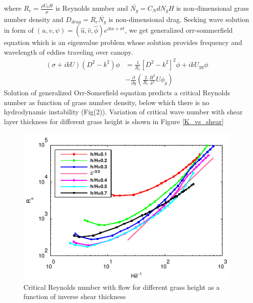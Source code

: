 \documentclass[aps,twocolumn,floatfix,prl,10pt]{revtex4-1}
\newcommand{\del}{\partial}
\begin{document}
where $R_{e}= \frac{\rho U_0 H}{\mu}$ is Reynolds number and $\bar{N_g} = C_N d N_g H$ is non-dimensional grass number density and  $D_{drag} = R_{e}\bar{N_{g}}$ is 
non-dimensional drag. Seeking wave solution in form of $\left(u,v,\psi \right)= \left(\hat u, \hat v, \hat\phi \right)e^{ikx+\sigma t}$, we get generalized orr-sommerfield equation 
which is an eigenvalue problem whose solution provides frequency and wavelength of eddies traveling over canopy.
\small
\begin{equation}
\begin{split}
\left(\sigma+ikU\right) \left(D^2-k^2\right)\phi &= \frac{1}{R_{e}}\left[D^2 -k^{2} \right]^2\phi +ikU_{yy}\phi \\
&-\frac{\del}{\del y}\left(\frac{2}{R_e}\frac{H^3}{\delta^3}U\phi_y\right)
\label{Orr-somerfield}
\end{split}
\end{equation}
\normalsize
Solution of generalized Orr-Somerfield equation predicts a critical Reynolds number as function of grass number density, below which there is no hydrodynamic instability (Fig(2)).
Variation of critical wave number with shear layer thickness for different grass height is shown in Figure \ref{K_vs_shear}
\begin{figure}[htb]
\includegraphics[]{Critical_Re_vs_delta}
\caption{Critical Reynolds number with flow for different grass height as a function of inverse shear thickness}
\end{figure}
\end{document}
